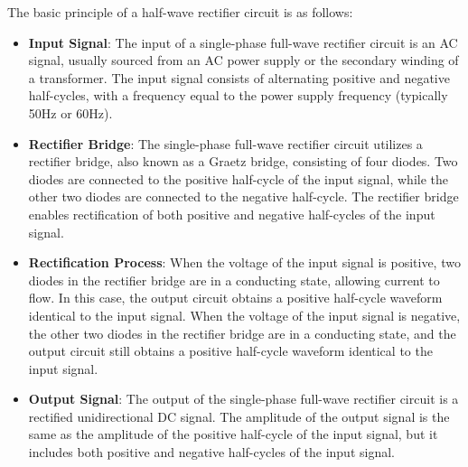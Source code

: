 \documentclass[UTF8]{article}
\begin{document}
   The basic principle of a half-wave rectifier circuit is as follows:
   \begin{itemize}
   \item \textbf{Input Signal}: The input of a single-phase full-wave rectifier circuit is an AC signal, usually sourced from an AC power supply or the secondary winding of a transformer. The input signal consists of alternating positive and negative half-cycles, with a frequency equal to the power supply frequency (typically 50Hz or 60Hz).
   
   \item \textbf{Rectifier Bridge}: The single-phase full-wave rectifier circuit utilizes a rectifier bridge, also known as a Graetz bridge, consisting of four diodes. Two diodes are connected to the positive half-cycle of the input signal, while the other two diodes are connected to the negative half-cycle. The rectifier bridge enables rectification of both positive and negative half-cycles of the input signal.
   
   \item \textbf{Rectification Process}: When the voltage of the input signal is positive, two diodes in the rectifier bridge are in a conducting state, allowing current to flow. In this case, the output circuit obtains a positive half-cycle waveform identical to the input signal. When the voltage of the input signal is negative, the other two diodes in the rectifier bridge are in a conducting state, and the output circuit still obtains a positive half-cycle waveform identical to the input signal.
   
   \item \textbf{Output Signal}: The output of the single-phase full-wave rectifier circuit is a rectified unidirectional DC signal. The amplitude of the output signal is the same as the amplitude of the positive half-cycle of the input signal, but it includes both positive and negative half-cycles of the input signal.
   
   \end{itemize}
   
\end{document}
